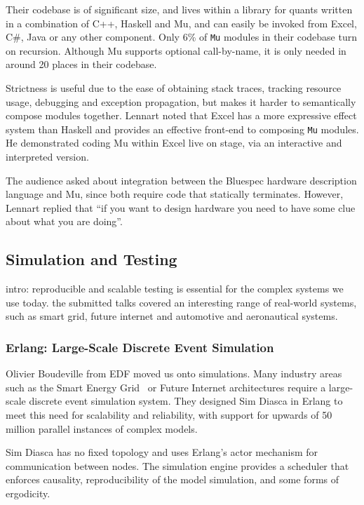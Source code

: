 \documentclass{jfp1}
\begin{document}
Their codebase is of significant size, and lives within a library for quants
written in a combination of C++, Haskell and Mu, and can easily be invoked from
Excel, C\#, Java or any other component. Only 6\% of {\tt Mu} modules in their
codebase turn on recursion. Although Mu supports optional call-by-name, it is
only needed in around 20 places in their codebase.

Strictness is useful due to the ease of obtaining stack traces, tracking
resource usage, debugging and exception propagation, but makes it harder to
semantically compose modules together.  Lennart noted that Excel has a more
expressive effect system than Haskell and provides an effective front-end to
composing {\tt Mu} modules. He demonstrated coding Mu within Excel live on stage,
via an interactive and interpreted version.

The audience asked about integration between the Bluespec hardware description
language and Mu, since both require code that statically terminates. However,
Lennart replied that ``if you want to design hardware you need to have some
clue about what you are doing''.

\subsection{Simulation and Testing}

intro: reproducible and scalable testing is essential for the complex systems we use today. the submitted talks covered an interesting range of real-world systems, such as smart grid, future internet and automotive and aeronautical systems.

\subsubsection{Erlang: Large-Scale Discrete Event Simulation}

Olivier Boudeville from EDF moved us onto simulations. Many industry areas such
as the Smart Energy Grid~\cite{x} or Future Internet architectures require a
large-scale discrete event simulation system. They designed Sim Diasca in
Erlang to meet this need for scalability and reliability, with support for
upwards of 50 million parallel instances of complex models.

Sim Diasca has no fixed topology and uses Erlang's actor mechanism for communication
between nodes. The simulation engine provides a scheduler that enforces causality, reproducibility of
the model simulation, and some forms of ergodicity. 
\end{document}
